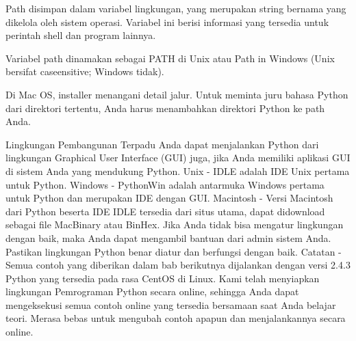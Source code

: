 \vspace{14pt}
\noindent 
{\fontsize{14pt}{14pt}\selectfont Path disimpan dalam variabel lingkungan, yang merupakan string bernama yang dikelola oleh sistem operasi. Variabel ini berisi informasi yang tersedia untuk perintah shell dan program lainnya. \\} \par
\vspace{14pt}
\noindent 
{\fontsize{14pt}{14pt}\selectfont Variabel path dinamakan sebagai PATH di Unix atau Path in Windows (Unix bersifat caseensitive; Windows tidak). \\} \par
\vspace{14pt}
\noindent 
{\fontsize{14pt}{14pt}\selectfont Di Mac OS, installer menangani detail jalur. Untuk meminta juru bahasa Python dari direktori tertentu, Anda harus menambahkan direktori Python ke path Anda. \\} \par
\vspace{14pt}
\noindent 
{\fontsize{14pt}{14pt}\selectfont \vspace{\baselineskip}
Lingkungan Pembangunan Terpadu Anda dapat menjalankan Python dari lingkungan Graphical User Interface (GUI) juga, jika Anda memiliki aplikasi GUI di sistem Anda yang mendukung Python. Unix - IDLE adalah IDE Unix pertama untuk Python. Windows - PythonWin adalah antarmuka Windows pertama untuk Python dan merupakan IDE dengan GUI. Macintosh - Versi Macintosh dari Python beserta IDE IDLE tersedia dari situs utama, dapat didownload sebagai file MacBinary atau BinHex. Jika Anda tidak bisa mengatur lingkungan dengan baik, maka Anda dapat mengambil bantuan dari admin sistem Anda. Pastikan lingkungan Python benar diatur dan berfungsi dengan baik. Catatan - Semua contoh yang diberikan dalam bab berikutnya dijalankan dengan versi 2.4.3 Python yang tersedia pada rasa CentOS di Linux. Kami telah menyiapkan lingkungan Pemrograman Python secara online, sehingga Anda dapat mengeksekusi semua contoh online yang tersedia bersamaan saat Anda belajar teori. Merasa bebas untuk mengubah contoh apapun dan menjalankannya secara online. \\} \par
\vspace{14pt}
\noindent 
